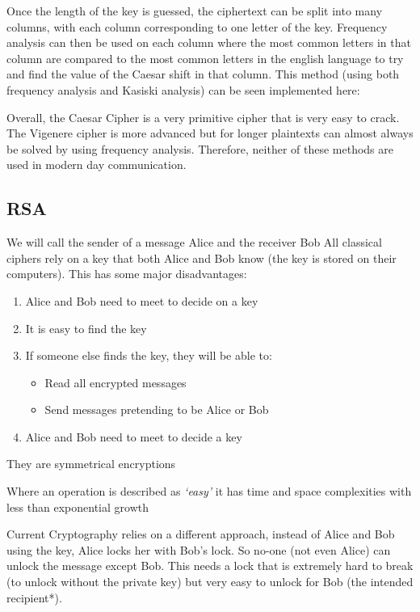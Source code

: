 \documentclass{article}
\begin{document}
Once the length of the key is guessed, the ciphertext can be split into many columns, with each column corresponding to one letter of the key. Frequency analysis can then  be used on each column where the most common letters in that column are compared to the most common letters in the english language to try and find the value of the Caesar shift in that column. This method (using both frequency analysis and Kasiski analysis) can be seen implemented here:\medskip

Overall, the Caesar Cipher is a very primitive cipher that is very easy to crack. The Vigenere cipher is more advanced but for longer plaintexts can almost always be solved by using frequency analysis. Therefore, neither of these methods are used in modern day communication.

\subsection{RSA}
We will call the sender of a message Alice and the receiver Bob
All classical ciphers rely on a key that both Alice and Bob know (the key is stored on their computers).
This has some major disadvantages:
\begin{enumerate}
\item Alice and Bob need to meet to decide on a key
\item It is easy to find the key 
\item If someone else finds the key, they will be able to:
\begin{itemize}
\item Read all encrypted messages
\item Send messages pretending to be Alice or Bob
\end{itemize}
\item Alice and Bob need to meet to decide a key
\end{enumerate}

They are symmetrical encryptions

Where an operation is described as \textit{\lq{}easy\rq{}} it has time and space complexities with less than exponential growth

Current Cryptography relies on a different approach, instead of Alice and Bob using the key, Alice locks her with Bob's lock. So no-one (not even Alice) can unlock the message except Bob. This needs a lock that is extremely hard to break (to unlock without the private key) but very easy to unlock for Bob (the intended recipient*).
\end{document}
